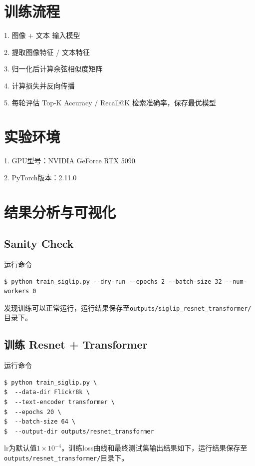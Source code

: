 \documentclass[a4paper]{article}
\begin{document}
\section{训练流程}

    1. 图像 + 文本 输入模型 

    2. 提取图像特征 / 文本特征

    3. 归一化后计算余弦相似度矩阵
    
    4. 计算损失并反向传播

    5. 每轮评估 Top-K Accuracy / Recall@K 检索准确率，保存最优模型

\section{实验环境}

1. GPU型号：NVIDIA GeForce RTX 5090

2. PyTorch版本：2.11.0


\section{结果分析与可视化}

\subsection{Sanity Check}

运行命令

\begin{lstlisting}
$ python train_siglip.py --dry-run --epochs 2 --batch-size 32 --num-workers 0
\end{lstlisting}

发现训练可以正常运行，运行结果保存至\texttt{outputs/siglip\_resnet\_transformer/}目录下。


\subsection{训练 Resnet + Transformer}

运行命令

\begin{lstlisting}
$ python train_siglip.py \
$  --data-dir Flickr8k \
$  --text-encoder transformer \
$  --epochs 20 \
$  --batch-size 64 \
$  --output-dir outputs/resnet_transformer
\end{lstlisting}

lr为默认值$1\times 10^{-4}$。训练loss曲线和最终测试集输出结果如下，运行结果保存至\texttt{outputs/resnet\_transformer/}目录下。
\end{document}
